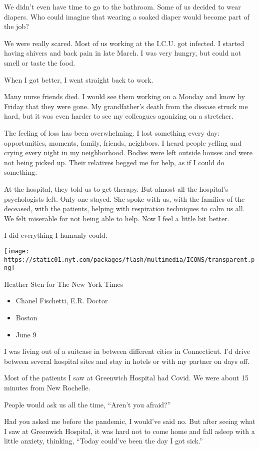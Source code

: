 We didn't even have time to go to the bathroom. Some of us decided to
wear diapers. Who could imagine that wearing a soaked diaper would
become part of the job?

We were really scared. Most of us working at the I.C.U. got infected. I
started having shivers and back pain in late March. I was very hungry,
but could not smell or taste the food.

When I got better, I went straight back to work.

Many nurse friends died. I would see them working on a Monday and know
by Friday that they were gone. My grandfather's death from the disease
struck me hard, but it was even harder to see my colleagues agonizing on
a stretcher.

The feeling of loss has been overwhelming. I lost something every day:
opportunities, moments, family, friends, neighbors. I heard people
yelling and crying every night in my neighborhood. Bodies were left
outside houses and were not being picked up. Their relatives begged me
for help, as if I could do something.

At the hospital, they told us to get therapy. But almost all the
hospital's psychologists left. Only one stayed. She spoke with us, with
the families of the deceased, with the patients, helping with
respiration techniques to calm us all. We felt miserable for not being
able to help. Now I feel a little bit better.

I did everything I humanly could.

\texttt{[image: https://static01.nyt.com/packages/flash/multimedia/ICONS/transparent.png]}

Heather Sten for The New York Times

\begin{itemize}
\tightlist
\item
  Chanel Fischetti, E.R. Doctor
\item
  Boston
\item
  June 9
\end{itemize}

I was living out of a suitcase in between different cities in
Connecticut. I'd drive between several hospital sites and stay in hotels
or with my partner on days off.

Most of the patients I saw at Greenwich Hospital had Covid. We were
about 15 minutes from New Rochelle.

People would ask us all the time, ``Aren't you afraid?''

Had you asked me before the pandemic, I would've said no. But after
seeing what I saw at Greenwich Hospital, it was hard not to come home
and fall asleep with a little anxiety, thinking, ``Today could've been
the day I got sick.''

